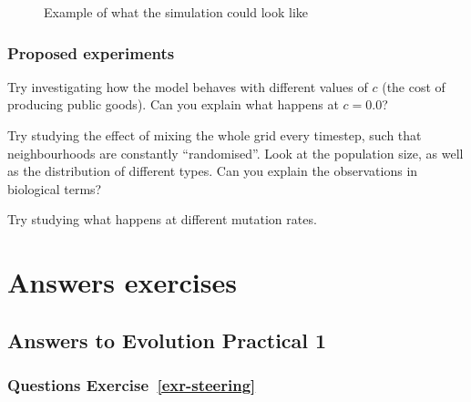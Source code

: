 \documentclass[
  letterpaper,
  DIV=11,
  numbers=noendperiod]{scrreprt}
\theoremstyle{definition}
\theoremstyle{remark}
\begin{document}
\begin{figure}


\caption{\label{fig-examplegrid}Example of what the simulation could
look like}

\end{figure}%

\subsection{Proposed experiments}\label{proposed-experiments}

Try investigating how the model behaves with different values of \(c\)
(the cost of producing public goods). Can you explain what happens at
\(c=0.0\)?

Try studying the effect of mixing the whole grid every timestep, such
that neighbourhoods are constantly ``randomised''. Look at the
population size, as well as the distribution of different types. Can you
explain the observations in biological terms?

Try studying what happens at different mutation rates.

\chapter{Answers exercises}\label{answers-exercises}

\section{Answers to Evolution Practical
1}\label{answers-to-evolution-practical-1}

\subsection{\texorpdfstring{Questions
Exercise~\ref{exr-steering}}{Questions Exercise~}}\label{questions-exr-steering}
\end{document}
